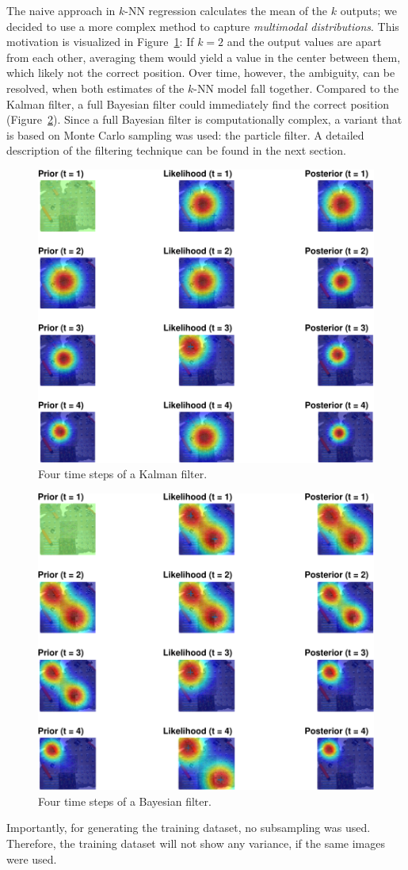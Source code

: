 \documentclass{report}
\begin{document}
The naive approach in $k$-NN regression calculates the mean of the $k$
outputs; we decided to use a more complex method to capture
\emph{multimodal distributions}. This motivation is visualized in
Figure~\ref{fig:Kalman}: If $k=2$ and the output values are apart from
each other, averaging them would yield a value in the center between
them, which likely not the correct position. Over time, however, the
ambiguity, can be resolved, when both estimates of the $k$-NN model
fall together. Compared to the Kalman filter, a full Bayesian filter
could immediately find the correct position
(Figure~\ref{fig:bayesianfilter}). Since a full Bayesian filter is
computationally complex, a variant that is based on Monte Carlo
sampling was used: the particle filter. A detailed description of the
filtering technique can be found in the next section.
\begin{figure}[t]
\label{fig:Kalman}
\begin{center}
\includegraphics[width=0.7\columnwidth]{kalman-crop}
\caption{ Four time steps of a Kalman filter.%
}
\end{center}
\end{figure}
\begin{figure}[t]
\label{fig:bayesianfilter}
\begin{center}
\includegraphics[width=0.7\columnwidth]{particle-crop}
\caption{ Four time steps of a Bayesian filter.}
\end{center}
\end{figure}
Importantly, for generating the training dataset, no subsampling was
used. Therefore, the training dataset will not show any variance, if
the same images were used.
\end{document}
